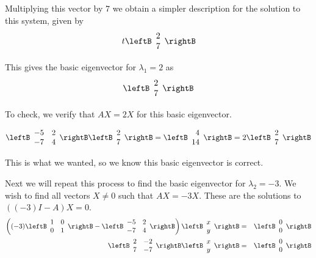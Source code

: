 \begin{solution}
Multiplying this vector by $7$ we obtain a simpler description for the solution to this system, given by
\[
t \leftB \begin{array}{r}
2 \\
7
\end{array} \rightB
\]

This gives the basic eigenvector for $\lambda_1 = 2$ as 
\[
\leftB \begin{array}{r}
2\\
7
\end{array} \rightB
\]

To check, we verify that $AX = 2X$ for this basic eigenvector. 

\[
\leftB \begin{array}{rr}
-5 & 2 \\
-7 & 4
\end{array}\rightB 
\leftB \begin{array}{r}
2 \\
7
\end{array} \rightB
=
\leftB \begin{array}{r}
4 \\
14
\end{array}\rightB
=
2
\leftB \begin{array}{r}
2\\
7
\end{array}
\rightB
\]

This is what we wanted, so we know this basic eigenvector is correct. 

Next we will repeat this process to find the basic eigenvector for $\lambda_2 = -3$. We wish to find all vectors $X \neq 0$ such that $AX = -3X$. These are the solutions to $((-3)I-A)X = 0$. 
\begin{eqnarray*}
\left( 
(-3) \leftB \begin{array}{rr}
1 & 0 \\
0 & 1 
\end{array}\rightB - 
\leftB \begin{array}{rr}
-5 & 2 \\
-7 & 4
\end{array}\rightB  \right) \leftB \begin{array}{c}
x \\
y 
\end{array}\rightB &=& \leftB \begin{array}{r}
0 \\
0
\end{array} \rightB \\
\leftB \begin{array}{rr}
2 & -2 \\
7 & -7
\end{array}\rightB \leftB \begin{array}{c}
x \\
y 
\end{array}\rightB &=& \leftB \begin{array}{r}
0 \\
0
\end{array} \rightB 
\end{eqnarray*}


\end{solution}
